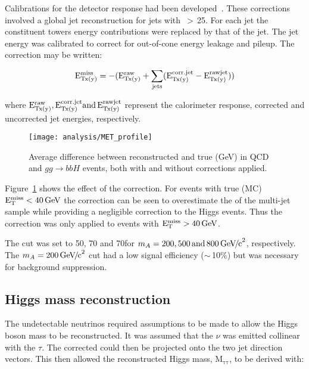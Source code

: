 Calibrations for the detector \MET response had been developed~\cite{citeulike:905600}. These corrections involved a global jet reconstruction for jets with \ET\,$>$\,25\GeV. For each jet the constituent towers energy contributions were replaced by that of the jet. The jet energy was calibrated to correct for out-of-cone energy leakage and pileup. The correction may be written:

\begin{equation}
\rm E_{\rm Tx(y)}^{\rm miss}= -(\rm E _{Tx(y)}^{\rm raw}+
                           \sum _{jets} (\rm E _{\rm Tx(y)}^{\rm corr.jet} - \rm E _{\rm Tx(y)}^{\rm raw jet}))
\label{eqn:MET_corr}
\end{equation}

where $\rm E _{Tx(y)}^{\rm raw}, \rm E _{\rm Tx(y)}^{\rm corr.jet} \mathrm{ and }\,\rm E _{\rm Tx(y)}^{\rm raw jet}$ represent the calorimeter response, corrected and uncorrected jet energies, respectively. 

\begin{figure}[!Hhtb]
\centering
\texttt{[image: analysis/MET\_profile]}
\caption{Average difference between reconstructed and true \MET (GeV) in QCD and $gg \rightarrow bbH$ events, both with and without corrections applied.\label{fig:MET_profile}}
\end{figure}

Figure~\ref{fig:MET_profile} shows the effect of the \MET correction. For events with true (MC) $\mathrm{E_{T}^{miss}} < 40 \,\mathrm{Ge\hspace{-.08em}V}$ the correction can be seen to overestimate the \MET of the multi-jet sample while providing a negligible correction to the Higgs events. Thus the correction was only applied to events with $\mathrm{E_{T}^{miss}} > 40 \,\mathrm{Ge\hspace{-.08em}V}$.

The \MET cut was set to 50, 70 and 70\GeV for $m_{A} = 200, 500 \mathrm{\,and\,} 800{\,\mathrm{Ge\hspace{-.08em}V\hspace{-0.16em}/\hspace{-0.08em}c}^\mathrm{2}}$, respectively. The $m_{A} = 200 {\,\mathrm{Ge\hspace{-.08em}V\hspace{-0.16em}/\hspace{-0.08em}c}^\mathrm{2}}$ cut had a low signal efficiency ($\sim$\,10\%) but was necessary for background suppression.

\subsection{Higgs mass reconstruction}
The undetectable neutrinos required assumptions to be made to allow the Higgs boson mass to be reconstructed. It was assumed that the $\nu$ was emitted collinear with the $\tau$. The corrected \MET could then be projected onto the two jet direction vectors. This then allowed the reconstructed Higgs mass, $\mathrm{M_{\tau \tau}}$, to be derived with:


